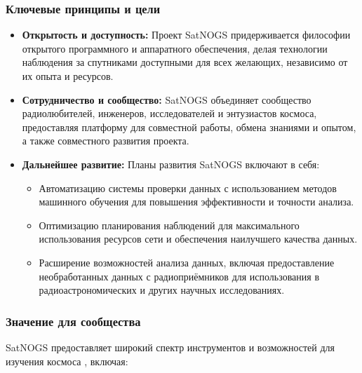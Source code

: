 \documentclass[14pt, a4paper]{extreport}
\begin{document}
    \subsubsection{Ключевые принципы и цели}

    \begin{itemize}
        \item \textbf{Открытость и доступность:} Проект SatNOGS придерживается философии открытого программного и аппаратного обеспечения, делая технологии наблюдения за спутниками доступными для всех желающих, независимо от их опыта и ресурсов.
        \item \textbf{Сотрудничество и сообщество:} SatNOGS объединяет сообщество радиолюбителей, инженеров, исследователей и энтузиастов космоса, предоставляя платформу для совместной работы, обмена знаниями и опытом,  а также совместного развития проекта.
        \item \textbf{Дальнейшее развитие:} Планы развития SatNOGS включают в себя:
        \begin{itemize}
            \item Автоматизацию системы проверки данных с использованием методов машинного обучения для повышения эффективности и точности анализа.
            \item Оптимизацию планирования наблюдений для максимального использования ресурсов сети и обеспечения наилучшего качества данных.
            \item Расширение возможностей анализа данных, включая предоставление необработанных данных с радиоприёмников для использования в радиоастрономических и других научных исследованиях.
        \end{itemize}
    \end{itemize}

    \subsubsection{Значение для сообщества}

    SatNOGS предоставляет широкий спектр инструментов и возможностей для изучения космоса \cite{satnogs_general_docs},  включая:
\end{document}
